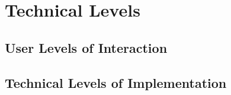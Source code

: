 \chapter{Technical Levels}\label{cha:levels}


\section{User Levels of Interaction}\label{sec:user_levels}

\section{Technical Levels of Implementation}\label{sec:tech_levels}